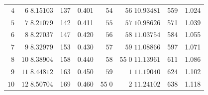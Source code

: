 \begin{center}
\begin{tabular}{|r|r|r|r||r|r|r|r|}
\(4\)&\(6\;8.15103\)&137&0.401&\(54\)&\(56\;10.93481\)&559&1.024\\
\(5\)&\(7\;8.21079\)&142&0.411&\(55\)&\(57\;10.98626\)&571&1.039\\
\(6\)&\(8\;8.27037\)&147&0.420&\(56\)&\(58\;11.03754\)&584&1.055\\
\(7\)&\(9\;8.32979\)&153&0.430&\(57\)&\(59\;11.08866\)&597&1.071\\
\(8\)&\(10\;8.38904\)&158&0.440&\(58\)&\(55\;0\;11.13961\)&611&1.086\\
\(9\)&\(11\;8.44812\)&163&0.450&\(59\)&\(1\;11.19040\)&624&1.102\\
\(10\)&\(12\;8.50704\)&169&0.460&\(55\;0\)&\(2\;11.24102\)&638&1.118\\
\hline
\end{tabular}
\end{center}
\endgroup
